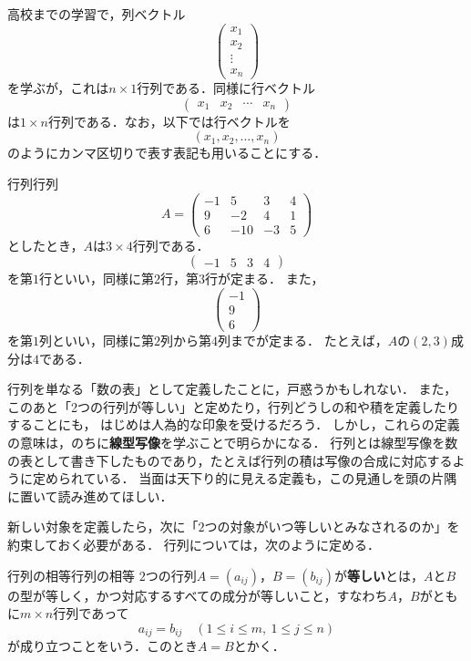 高校までの学習で，列ベクトル
\[
  \begin{pmatrix} x_1 \\ x_2 \\ \vdots \\ x_n \end{pmatrix}
\]
を学ぶが，これは$n \times 1$行列である．同様に行ベクトル
\[
  \begin{pmatrix} x_1 & x_2 & \cdots & x_n \end{pmatrix}
\]
は$1 \times n$行列である．なお，以下では行ベクトルを
\[
  (x_1, x_2, \dots, x_n)
\]
のようにカンマ区切りで表す表記も用いることにする．

\begin{example}{行列}{行列}
  \[
    A =
    \begin{pmatrix}
      -1 & 5 & 3 & 4 \\
      9 & -2 & 4 & 1 \\
      6 & -10 & -3 & 5
    \end{pmatrix}
  \]
  としたとき，$A$は$3 \times 4$行列である．
  \[
    \begin{pmatrix} -1 & 5 & 3 & 4 \end{pmatrix}
  \]
  を第$1$行といい，同様に第$2$行，第$3$行が定まる．
  また，
  \[
    \begin{pmatrix} -1 \\ 9 \\ 6 \end{pmatrix}
  \]
  を第$1$列といい，同様に第$2$列から第$4$列までが定まる．
  たとえば，$A$の$(2, 3)$成分は$4$である．
\end{example}

\begin{mycolumn}
  行列を単なる「数の表」として定義したことに，戸惑うかもしれない．
  また，このあと「2つの行列が等しい」と定めたり，行列どうしの和や積を定義したりすることにも，
  はじめは人為的な印象を受けるだろう．
  しかし，これらの定義の意味は，のちに\textbf{線型写像}を学ぶことで明らかになる．
  行列とは線型写像を数の表として書き下したものであり，たとえば行列の積は写像の合成に対応するように定められている．
  当面は天下り的に見える定義も，この見通しを頭の片隅に置いて読み進めてほしい．
\end{mycolumn}

新しい対象を定義したら，次に「$2$つの対象がいつ等しいとみなされるのか」を約束しておく必要がある．
行列については，次のように定める．
 
\begin{definition}{行列の相等}{行列の相等}
  $2$つの行列$A = (a_{ij})$，$B = (b_{ij})$が\textbf{等しい}とは，$A$と$B$の型が等しく，かつ対応するすべての成分が等しいこと，すなわち$A$，$B$がともに$m \times n$行列であって
  \[
    a_{ij} = b_{ij} \quad (1 \le i \le m,~1 \le j \le n)
  \]
  が成り立つことをいう．このとき$A = B$とかく．
\end{definition}
 
